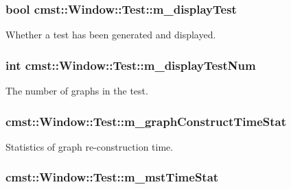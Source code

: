 \subsubsection[{\texorpdfstring{m\_displayTest}{m_displayTest}}]{\setlength{\rightskip}{0pt plus 5cm}bool cmst::Window::Test::m\_displayTest}\hypertarget{structcmst_1_1_window_1_1_test_a6e01140b018e7c479b15ae6499d8b9e8}{}\label{structcmst_1_1_window_1_1_test_a6e01140b018e7c479b15ae6499d8b9e8}


Whether a test has been generated and displayed. 

\subsubsection[{\texorpdfstring{m\_displayTestNum}{m_displayTestNum}}]{\setlength{\rightskip}{0pt plus 5cm}int cmst::Window::Test::m\_displayTestNum}\hypertarget{structcmst_1_1_window_1_1_test_a0968826c727c33df28c160c4095e0b2f}{}\label{structcmst_1_1_window_1_1_test_a0968826c727c33df28c160c4095e0b2f}


The number of graphs in the test. 

\subsubsection[{\texorpdfstring{m\_graphConstructTimeStat}{m_graphConstructTimeStat}}]{ cmst::Window::Test::m\_graphConstructTimeStat}\hypertarget{structcmst_1_1_window_1_1_test_a4ff72191889ff43d7d80517120a97fae}{}\label{structcmst_1_1_window_1_1_test_a4ff72191889ff43d7d80517120a97fae}


Statistics of graph re-\/construction time. 

\subsubsection[{\texorpdfstring{m\_mstTimeStat}{m_mstTimeStat}}]{ cmst::Window::Test::m\_mstTimeStat}\hypertarget{structcmst_1_1_window_1_1_test_a103594f227a761c33c06b8dd68713c18}{}\label{structcmst_1_1_window_1_1_test_a103594f227a761c33c06b8dd68713c18}


